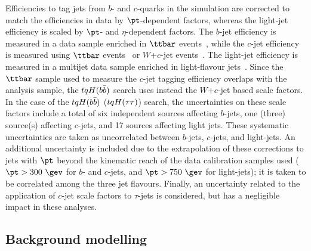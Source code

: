 Efficiencies to tag jets from $b$- and $c$-quarks in the simulation are corrected to match the efficiencies in data by $\pt$-dependent factors,
whereas the light-jet efficiency is scaled by $\pt$- and $\eta$-dependent factors.
The $b$-jet efficiency is measured in a data sample enriched in $\ttbar$ events~\cite{Aaboud:2018xwy}, while the $c$-jet efficiency is measured
using $\ttbar$ events~\cite{ATLAS-CONF-2018-001} or $W$+$c$-jet events~\cite{Aad:2015ydr}. 
The light-jet efficiency is measured in a multijet data sample enriched in light-flavour jets~\cite{ATLAS-CONF-2018-006}.
Since the $\ttbar$ sample used to measure the $c$-jet tagging efficiency overlaps with the analysis sample, the $tqH(b\bar{b})$ search uses
instead the $W$+$c$-jet based scale factors.  
In the case of the $tqH(b\bar{b})$ ($tqH(\tau\tau)$) search, the uncertainties on these scale factors include a total of six independent sources affecting $b$-jets, one (three) source(s) affecting $c$-jets, and 17 sources affecting light jets. 
These systematic uncertainties are taken as uncorrelated between $b$-jets, $c$-jets, and light-jets. 
An additional uncertainty is included due to the extrapolation of these corrections to jets 
with $\pt$ beyond the kinematic reach of the data calibration samples used ($\pt>300~\gev$ for $b$- and $c$-jets, 
and $\pt>750~\gev$ for light-jets); it is taken to be correlated among the three jet flavours. 
Finally, an uncertainty related to the application of $c$-jet scale factors to $\tau$-jets is considered,
but has a negligible impact in these analyses.

\subsection{Background modelling}
\label{sec:syst_bkgmodeling}


